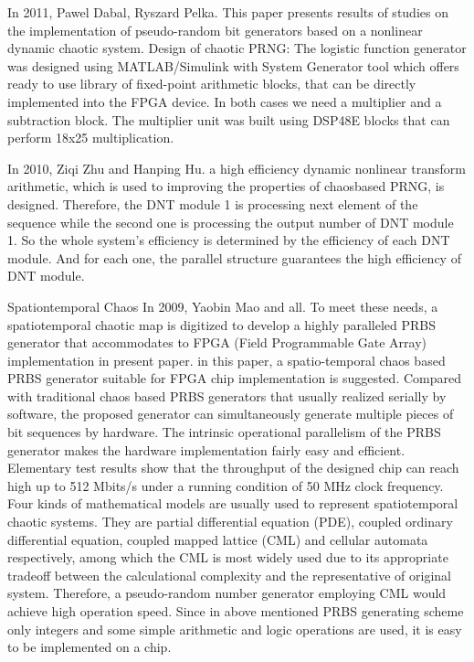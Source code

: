 In 2011, Pawel Dabal, Ryszard Pelka. This paper presents results of studies on the implementation of pseudo-random bit generators based on a nonlinear dynamic chaotic system. Design of chaotic PRNG: The logistic function generator was designed using MATLAB/Simulink with System Generator tool which offers ready to use library of fixed-point arithmetic blocks, that can be directly implemented into the FPGA device. In both cases we need a multiplier and a subtraction block. The multiplier unit was built using DSP48E blocks that can perform 18x25 multiplication.

In 2010, Ziqi Zhu and Hanping Hu. a high efficiency dynamic nonlinear transform arithmetic, which is used to improving the properties of chaosbased PRNG, is designed. Therefore, the DNT module 1 is processing next element of the sequence while the second one is processing the output number of DNT module 1. So the whole system's efficiency is determined by the efficiency of each DNT module. And for each one, the parallel structure guarantees the high efficiency of DNT module.


Spationtemporal Chaos
In 2009, Yaobin Mao and all. To meet these needs, a spatiotemporal chaotic map is digitized to develop a highly paralleled PRBS generator that accommodates to FPGA (Field Programmable Gate Array) implementation in present paper. in this paper, a spatio-temporal chaos based PRBS generator suitable for FPGA chip implementation is suggested. Compared with traditional chaos based PRBS generators that usually realized serially by software, the proposed generator can simultaneously generate multiple pieces of bit sequences by hardware. The intrinsic operational parallelism of the PRBS generator makes the hardware implementation fairly easy and efficient. Elementary test results show that the throughput of the designed chip can reach high up to 512 Mbits/s under a running condition of 50 MHz clock frequency. Four kinds of mathematical models are usually used to represent spatiotemporal chaotic systems. They are partial differential equation (PDE), coupled ordinary differential equation, coupled mapped lattice (CML) and cellular automata respectively, among which the CML is most widely used due to its appropriate tradeoff between the calculational complexity and the representative of original system. Therefore, a pseudo-random number generator employing CML would achieve high operation speed. Since in above mentioned PRBS generating scheme only integers and some simple arithmetic and logic operations are used, it is easy to be implemented on a chip. 

